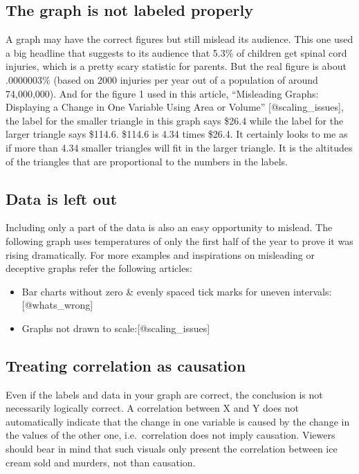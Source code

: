 \documentclass[]{book}
\providecommand{\tightlist}{%
  \setlength{\itemsep}{0pt}\setlength{\parskip}{0pt}}
\theoremstyle{definition}
\theoremstyle{definition}
\theoremstyle{definition}
\theoremstyle{remark}
\begin{document}
\subsection{The graph is not labeled
properly}\label{the-graph-is-not-labeled-properly}

A graph may have the correct figures but still mislead its audience.
This one used a big headline that suggests to its audience that 5.3\% of
children get spinal cord injuries, which is a pretty scary statistic for
parents. But the real figure is about .0000003\% (based on 2000 injuries
per year out of a population of around 74,000,000). And for the figure 1
used in this article, ``Misleading Graphs: Displaying a Change in One
Variable Using Area or Volume'' {[}@scaling\_issues{]}, the label for
the smaller triangle in this graph says \$26.4 while the label for the
larger triangle says \$114.6. \$114.6 is 4.34 times \$26.4. It certainly
looks to me as if more than 4.34 smaller triangles will fit in the
larger triangle. It is the altitudes of the triangles that are
proportional to the numbers in the labels.

\subsection{Data is left out}\label{data-is-left-out}

Including only a part of the data is also an easy opportunity to
mislead. The following graph uses temperatures of only the first half of
the year to prove it was rising dramatically. For more examples and
inspirations on misleading or deceptive graphs refer the following
articles:

\begin{itemize}
\tightlist
\item
  Bar charts without zero \& evenly spaced tick marks for uneven
  intervals: {[}@whats\_wrong{]}
\item
  Graphs not drawn to scale:{[}@scaling\_issues{]}
\end{itemize}

\subsection{Treating correlation as
causation}\label{treating-correlation-as-causation}

Even if the labels and data in your graph are correct, the conclusion is
not necessarily logically correct. A correlation between X and Y does
not automatically indicate that the change in one variable is caused by
the change in the values of the other one, i.e.~correlation does not
imply causation. Viewers should bear in mind that such visuals only
present the correlation between ice cream sold and murders, not than
causation.
\end{document}
